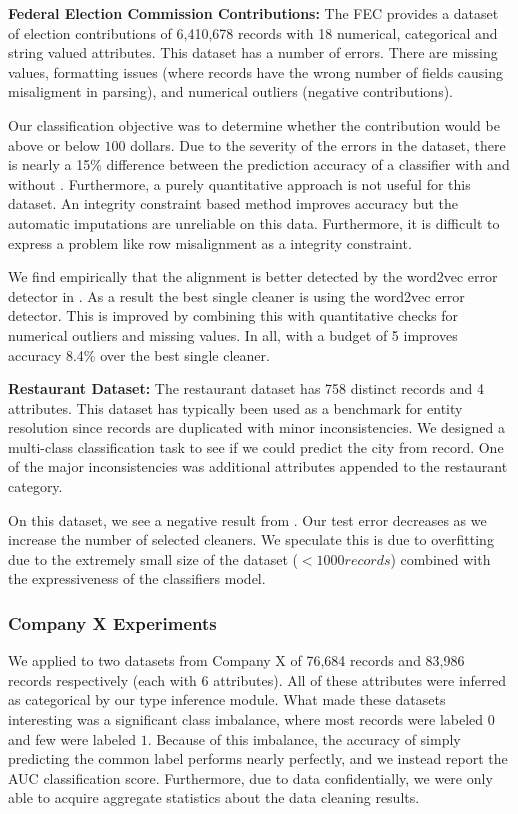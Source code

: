 \vspace{0.5em}\noindent\textbf{Federal Election Commission Contributions: } The FEC provides a dataset of election contributions of 6,410,678 records with 18 numerical, categorical and string valued attributes. This dataset has a number of errors. There are missing values, formatting issues (where records have the wrong number of fields causing misaligment in parsing), and numerical outliers (negative contributions).

Our classification objective was to determine whether the contribution would be above or below $100$ dollars. Due to the severity of the errors in the dataset, there is nearly a 15\% difference between the prediction accuracy of a classifier with and without \sys.
Furthermore, a purely quantitative approach is not useful for this dataset.
An integrity constraint based method improves accuracy but the automatic imputations are unreliable on this data.
Furthermore, it is difficult to express a problem like row misalignment as a integrity constraint.

We find empirically that the alignment is better detected by the word2vec error detector in \sys.
As a result the best single cleaner is using the word2vec error detector.
This is improved by combining this with quantitative checks for numerical outliers and missing values.
In all, \sys with a budget of 5 improves accuracy 8.4\% over the best single cleaner. 

\vspace{0.5em}\noindent\textbf{Restaurant Dataset: } The restaurant dataset has 758 distinct records and 4 attributes. This dataset has typically been used as a benchmark for entity resolution since records are duplicated with minor inconsistencies.
We designed a multi-class classification task to see if we could predict the city from record.
One of the major inconsistencies was additional attributes appended to the restaurant category.

On this dataset, we see a negative result from \sys. Our test error decreases as we increase the number of selected cleaners. We speculate this is due to overfitting due to the extremely small size of the dataset  ($<1000 records$) combined with the expressiveness of the classifiers model.

\subsubsection{Company X Experiments}
We applied \sys to two datasets from Company X of 76,684 records and 83,986 records respectively (each with 6 attributes). 
All of these attributes were inferred as categorical by our type inference module.
What made these datasets interesting was a significant class imbalance, where most records were labeled $0$ and few were labeled $1$.
Because of this imbalance, the accuracy of simply predicting the common label performs nearly perfectly, and we instead report the AUC classification score.  Furthermore, due to data confidentially, we were only able to acquire aggregate statistics about the data cleaning results.

